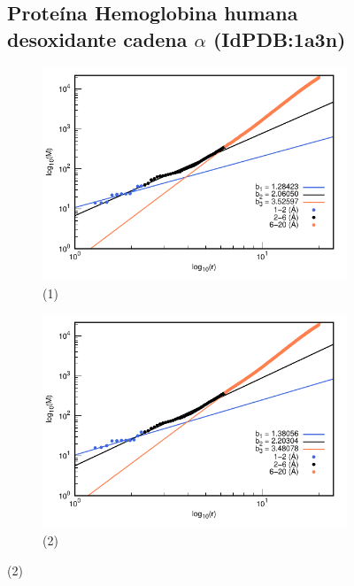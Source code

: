 \begin{figure}[H]
	\subsection*{Proteína Hemoglobina humana desoxidante cadena $\alpha$ (IdPDB:1a3n)}
	
	\hspace{-0.3cm} 
	\begin{subfigure}{0.49\textwidth}
		\centering
		\includegraphics[width=\linewidth,page=1]{graphs/PDBs/1a3n/1a3naddH.pdf}
		\caption{(1)}
	\end{subfigure}
	\hspace{0.2cm}
	\begin{subfigure}{0.49\textwidth}
		\centering
		\includegraphics[width=\linewidth,page=1]{graphs/PDBs/1a3n/1a3nEm.pdf}
		\caption{(2)}
	\end{subfigure}
	

\end{figure}
